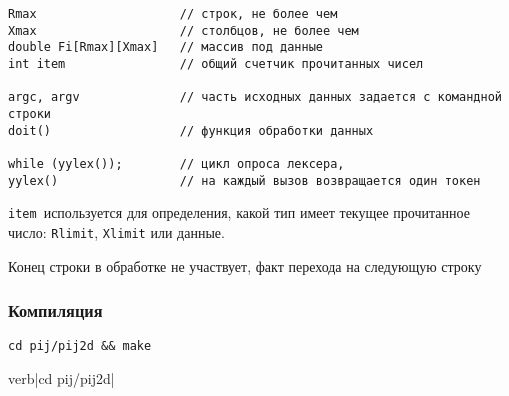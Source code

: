 
\begin{verbatim}
Rmax 					// строк, не более чем 
Xmax 					// столбцов, не более чем
double Fi[Rmax][Xmax]	// массив под данные
int item				// общий счетчик прочитанных чисел

argc, argv				// часть исходных данных задается с командной строки
doit()					// функция обработки данных

while (yylex());		// цикл опроса лексера,
yylex()					// на каждый вызов возвращается один токен
\end{verbatim}

\verb|item|\ используется для определения, какой тип имеет текущее 
прочитанное число: \verb|Rlimit|, \verb|Xlimit| или данные.

Конец строки в обработке не участвует, факт перехода на следующую строку

\subsubsection{Компиляция}

\verb|cd pij/pij2d && make|


verb|cd pij/pij2d|

\secup


